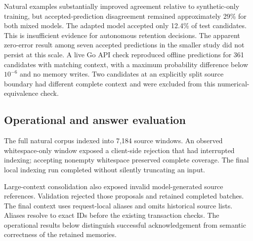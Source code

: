 Natural examples substantially improved agreement relative to synthetic-only
training, but accepted-prediction disagreement remained approximately 29\% for
both mixed models. The adapted model accepted only 12.4\% of test candidates.
This is insufficient evidence for autonomous retention decisions. The apparent
zero-error result among seven accepted predictions in the smaller study did not
persist at this scale. A live Go API check reproduced offline predictions for
361 candidates with matching context, with a maximum probability difference
below $10^{-6}$ and no memory writes. Two candidates at an explicitly split
source boundary had different complete context and were excluded from this
numerical-equivalence check.

\subsection{Operational and answer evaluation}
The full natural corpus indexed into 7,184 source windows. An observed
whitespace-only window exposed a client-side rejection that had interrupted
indexing; accepting nonempty whitespace preserved complete coverage. The final
local indexing run completed without silently truncating an input.

Large-context consolidation also exposed invalid model-generated source
references. Validation rejected those proposals and retained completed batches.
The final context uses request-local aliases and omits historical source lists.
Aliases resolve to exact IDs before the existing transaction checks. The
operational results below distinguish successful acknowledgement from semantic
correctness of the retained memories.


